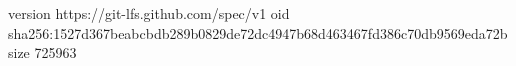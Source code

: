 version https://git-lfs.github.com/spec/v1
oid sha256:1527d367beabcbdb289b0829de72dc4947b68d463467fd386c70db9569eda72b
size 725963
